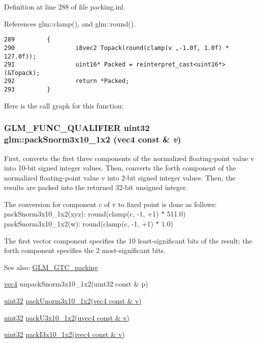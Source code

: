Definition at line 288 of file packing.inl.

References glm::clamp(), and glm::round().

\begin{Code}\begin{verbatim}289         {
290                 i8vec2 Topack(round(clamp(v ,-1.0f, 1.0f) * 127.0f));
291                 uint16* Packed = reinterpret_cast<uint16*>(&Topack);
292                 return *Packed;
293         }
\end{verbatim}
\end{Code}




Here is the call graph for this function:\hypertarget{group__gtc__packing_g0d4157cec37c0312216a7be1cc92df54}{
\subsubsection[packSnorm3x10\_\-1x2]{\setlength{\rightskip}{0pt plus 5cm}GLM\_\-FUNC\_\-QUALIFIER uint32 glm::packSnorm3x10\_\-1x2 (vec4 const \& {\em v})}}
\label{group__gtc__packing_g0d4157cec37c0312216a7be1cc92df54}


First, converts the first three components of the normalized floating-point value v into 10-bit signed integer values. Then, converts the forth component of the normalized floating-point value v into 2-bit signed integer values. Then, the results are packed into the returned 32-bit unsigned integer.

The conversion for component c of v to fixed point is done as follows: packSnorm3x10\_\-1x2(xyz): round(clamp(c, -1, +1) $\ast$ 511.0) packSnorm3x10\_\-1x2(w): round(clamp(c, -1, +1) $\ast$ 1.0)

The first vector component specifies the 10 least-significant bits of the result; the forth component specifies the 2 most-significant bits.

\begin{Desc}
\item[See also:]\hyperlink{group__gtc__packing}{GLM\_\-GTC\_\-packing} 

\hyperlink{group__core__types_g5881b1b022d7fd1b7218f5916532dd02}{vec4} unpackSnorm3x10\_\-1x2(uint32 const \& p) 

\hyperlink{group__gtc__type__precision_g202b6a53c105fcb7e531f9b443518451}{uint32} \hyperlink{group__gtc__packing_g2cf2d11b40bd48639110456fd74c2e33}{packUnorm3x10\_\-1x2(vec4 const \& v)} 

\hyperlink{group__gtc__type__precision_g202b6a53c105fcb7e531f9b443518451}{uint32} \hyperlink{group__gtc__packing_gf656d8862628f96b20de7a36eaa1fe56}{packU3x10\_\-1x2(uvec4 const \& v)} 

\hyperlink{group__gtc__type__precision_g202b6a53c105fcb7e531f9b443518451}{uint32} \hyperlink{group__gtc__packing_g032e18fa5bc5b8f3897104aeb2f1e195}{packI3x10\_\-1x2(ivec4 const \& v)} \end{Desc}


